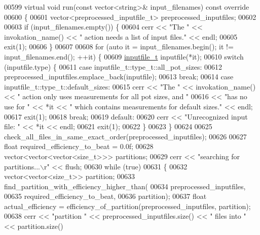 \begin{DoxyCode}
{{{{00599   \textcolor{keyword}{virtual} \textcolor{keywordtype}{void} run(\textcolor{keyword}{const} vector<string>& input\_filenames)\textcolor{keyword}{ const override}
00600 \textcolor{keyword}{  }\{
00601     vector<preprocessed\_inputfile\_t> preprocessed\_inputfiles;
00602 
00603     \textcolor{keywordflow}{if} (input\_filenames.empty()) \{
00604       cerr << \textcolor{stringliteral}{"The "} << invokation\_name() << \textcolor{stringliteral}{" action needs a list of input files."} << endl;
00605       exit(1);
00606     \}
00607 
00608     \textcolor{keywordflow}{for} (\textcolor{keyword}{auto} it = input\_filenames.begin(); it != input\_filenames.end(); ++it) \{
00609       \hyperlink{structinputfile__t}{inputfile\_t} inputfile(*it);
00610       \textcolor{keywordflow}{switch} (inputfile.type) \{
00611         \textcolor{keywordflow}{case} inputfile\_t::type\_t::all\_pot\_sizes:
00612           preprocessed\_inputfiles.emplace\_back(inputfile);
00613           \textcolor{keywordflow}{break};
00614         \textcolor{keywordflow}{case} inputfile\_t::type\_t::default\_sizes:
00615           cerr << \textcolor{stringliteral}{"The "} << invokation\_name() << \textcolor{stringliteral}{" action only uses measurements for all pot sizes, and "}
00616                << \textcolor{stringliteral}{"has no use for "} << *it << \textcolor{stringliteral}{" which contains measurements for default sizes."} << endl;
00617           exit(1);
00618           \textcolor{keywordflow}{break};
00619         \textcolor{keywordflow}{default}:
00620           cerr << \textcolor{stringliteral}{"Unrecognized input file: "} << *it << endl;
00621           exit(1);
00622       \}
00623     \}
00624 
00625     check\_all\_files\_in\_same\_exact\_order(preprocessed\_inputfiles);
00626 
00627     \textcolor{keywordtype}{float} required\_efficiency\_to\_beat = 0.0f;
00628     vector<vector<vector<size\_t>>> partitions;
00629     cerr << \textcolor{stringliteral}{"searching for partitions...\(\backslash\)r"} << flush;
00630     \textcolor{keywordflow}{while} (\textcolor{keyword}{true})
00631     \{
00632       vector<vector<size\_t>> partition;
00633       find\_partition\_with\_efficiency\_higher\_than(
00634         preprocessed\_inputfiles,
00635         required\_efficiency\_to\_beat,
00636         partition);
00637       \textcolor{keywordtype}{float} actual\_efficiency = efficiency\_of\_partition(preprocessed\_inputfiles, partition);
00638       cerr << \textcolor{stringliteral}{"partition "} << preprocessed\_inputfiles.size() << \textcolor{stringliteral}{" files into "} << partition.size()
}}}}
\end{DoxyCode}
